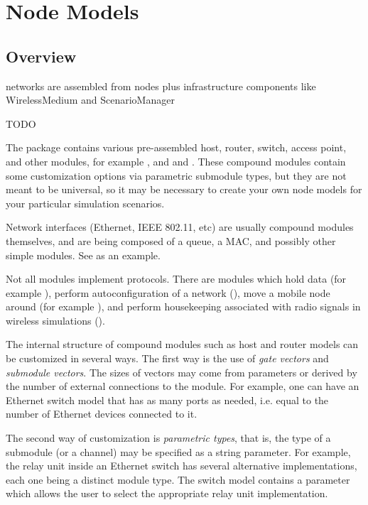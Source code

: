 \chapter{Node Models}
\label{cha:node-models}

\section{Overview}

networks are assembled from nodes plus infrastructure components like WirelessMedium
and ScenarioManager 

TODO

The  package contains various pre-assembled host, router,
switch, access point, and other modules, for example
,  and  and
. These compound modules contain some customization
options via parametric submodule types, but they are not meant to be
universal, so it may be necessary to create your own node models for
your particular simulation scenarios.

Network interfaces (Ethernet, IEEE 802.11, etc) are usually compound modules
themselves, and are being composed of a queue, a MAC, and possibly other
simple modules. See  as an example.

Not all modules implement protocols. There are modules which hold data (for
example ), perform autoconfiguration of a network
(), move a mobile node around (for example
), and perform housekeeping associated with
radio signals in wireless simulations ().

The internal structure of compound modules such as host and router models
can be customized in several ways. The first way is the use of \textit{gate
vectors} and \textit{submodule vectors}. The sizes of vectors may come from
parameters or derived by the number of external connections to the module.
For example, one can have an Ethernet switch model that has as many ports
as needed, i.e. equal to the number of Ethernet devices connected to it.

The second way of customization is \textit{parametric types}, that is, the
type of a submodule (or a channel) may be specified as a string parameter.
For example, the relay unit inside an Ethernet switch has several
alternative implementations, each one being a distinct module type. The
switch model contains a parameter which allows the user to select the
appropriate relay unit implementation.

